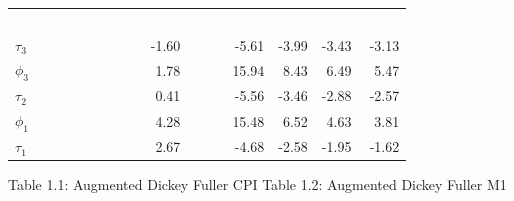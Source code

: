 \documentclass{article}
\newenvironment{myenv}
{
    \color{mydarkblue} %
    \fontsize{9pt}{9pt}\selectfont %

}
{
}
\begin{document}
\begin{adjustbox}{width=\textwidth}
            
            \begin{tabular}{lrrrrr}
                \rowcolor{mydarkblue}
                \textcolor{white}{Test Statistic}     & \textcolor{white}{Cval $I(0)$}        & \textcolor{white}{Cval $I(1)$}            & \textcolor{white}{1pct}           & \textcolor{white}{5pct}     & \textcolor{white}{10pct}             \\
                $\tau_3$                              &-1.60                                  &-5.61                                      &-3.99                              &-3.43                        &-3.13                                 \\
                $\phi_3$                              & 1.78                                  & 15.94                                     & 8.43                              & 6.49                        & 5.47                                 \\
                $\tau_2$                              & 0.41                                  &-5.56                                      &-3.46                              &-2.88                        &-2.57                                 \\
                $\phi_1$                              & 4.28                                  &15.48                                      & 6.52                              & 4.63                        & 3.81                                 \\
                $\tau_1$                              & 2.67                                  &-4.68                                      &-2.58                              &-1.95                        &-1.62                                 \\
            \end{tabular}
            \vspace*{0.5cm}
    \end{adjustbox}
    \begin{myenv}
        \hspace*{0.1\textwidth}
        Table 1.1: Augmented Dickey Fuller CPI
        \hspace*{0.15\textwidth}
        Table 1.2: Augmented Dickey Fuller M1
    \end{myenv}



    
\end{document}
